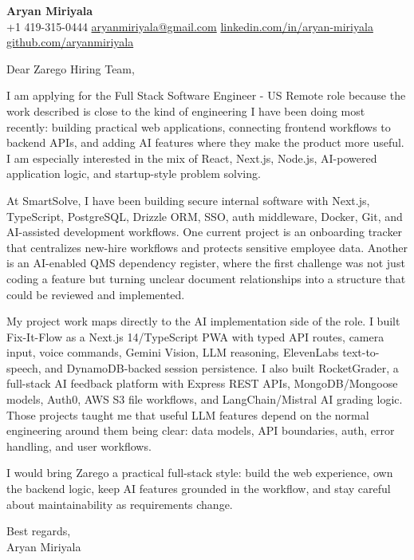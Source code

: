 \documentclass[letterpaper,11pt]{article}
\begin{document}
\begin{center}
    {\Large \textbf{Aryan Miriyala}}\\
    \vspace{2pt}
    +1 419-315-0444 \textbar{} \href{mailto:aryanmiriyala@gmail.com}{aryanmiriyala@gmail.com} \textbar{} \href{https://www.linkedin.com/in/aryan-miriyala-7788a21b6/}{linkedin.com/in/aryan-miriyala} \textbar{} \href{https://github.com/aryanmiriyala}{github.com/aryanmiriyala}
\end{center}

\vspace{10pt}

Dear Zarego Hiring Team,

I am applying for the Full Stack Software Engineer - US Remote role because the work described is close to the kind of engineering I have been doing most recently: building practical web applications, connecting frontend workflows to backend APIs, and adding AI features where they make the product more useful. I am especially interested in the mix of React, Next.js, Node.js, AI-powered application logic, and startup-style problem solving.

At SmartSolve, I have been building secure internal software with Next.js, TypeScript, PostgreSQL, Drizzle ORM, SSO, auth middleware, Docker, Git, and AI-assisted development workflows. One current project is an onboarding tracker that centralizes new-hire workflows and protects sensitive employee data. Another is an AI-enabled QMS dependency register, where the first challenge was not just coding a feature but turning unclear document relationships into a structure that could be reviewed and implemented.

My project work maps directly to the AI implementation side of the role. I built Fix-It-Flow as a Next.js 14/TypeScript PWA with typed API routes, camera input, voice commands, Gemini Vision, LLM reasoning, ElevenLabs text-to-speech, and DynamoDB-backed session persistence. I also built RocketGrader, a full-stack AI feedback platform with Express REST APIs, MongoDB/Mongoose models, Auth0, AWS S3 file workflows, and LangChain/Mistral AI grading logic. Those projects taught me that useful LLM features depend on the normal engineering around them being clear: data models, API boundaries, auth, error handling, and user workflows.

I would bring Zarego a practical full-stack style: build the web experience, own the backend logic, keep AI features grounded in the workflow, and stay careful about maintainability as requirements change.

\vspace{8pt}

Best regards,\\
Aryan Miriyala
\end{document}
